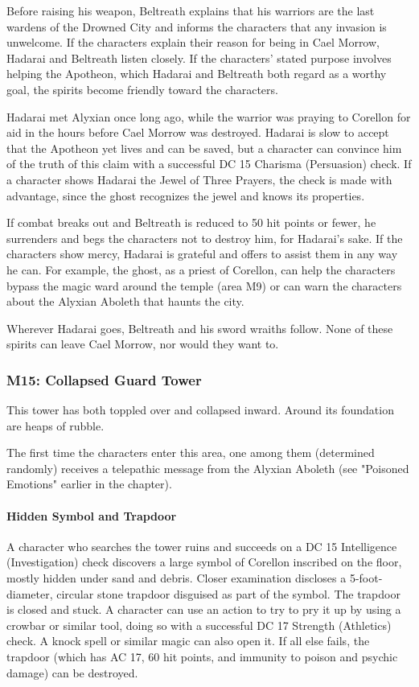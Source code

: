 \documentclass[10pt,a4paper,twoside,twocolumn,openany,nodeprecatedcode]{dndbook}
\begin{document}
Before raising his weapon, Beltreath explains that his warriors are the last wardens of the Drowned City and informs the characters that any invasion is unwelcome. If the characters explain their reason for being in Cael Morrow, Hadarai and Beltreath listen closely. If the characters' stated purpose involves helping the Apotheon, which Hadarai and Beltreath both regard as a worthy goal, the spirits become friendly toward the characters.

Hadarai met Alyxian once long ago, while the warrior was praying to Corellon for aid in the hours before Cael Morrow was destroyed. Hadarai is slow to accept that the Apotheon yet lives and can be saved, but a character can convince him of the truth of this claim with a successful DC 15 Charisma (Persuasion) check. If a character shows Hadarai the Jewel of Three Prayers, the check is made with advantage, since the ghost recognizes the jewel and knows its properties.

If combat breaks out and Beltreath is reduced to 50 hit points or fewer, he surrenders and begs the characters not to destroy him, for Hadarai's sake. If the characters show mercy, Hadarai is grateful and offers to assist them in any way he can. For example, the ghost, as a priest of Corellon, can help the characters bypass the magic ward around the temple (area M9) or can warn the characters about the Alyxian Aboleth that haunts the city.

Wherever Hadarai goes, Beltreath and his sword wraiths follow. None of these spirits can leave Cael Morrow, nor would they want to.

\subsubsection{M15: Collapsed Guard Tower}
\begin{DndReadAloud}{}
This tower has both toppled over and collapsed inward. Around its foundation are heaps of rubble.

\end{DndReadAloud}

The first time the characters enter this area, one among them (determined randomly) receives a telepathic message from the Alyxian Aboleth (see "Poisoned Emotions" earlier in the chapter).

\paragraph{Hidden Symbol and Trapdoor}
A character who searches the tower ruins and succeeds on a DC 15 Intelligence (Investigation) check discovers a large symbol of Corellon inscribed on the floor, mostly hidden under sand and debris. Closer examination discloses a 5-foot-diameter, circular stone trapdoor disguised as part of the symbol. The trapdoor is closed and stuck. A character can use an action to try to pry it up by using a crowbar or similar tool, doing so with a successful DC 17 Strength (Athletics) check. A knock spell or similar magic can also open it. If all else fails, the trapdoor (which has AC 17, 60 hit points, and immunity to poison and psychic damage) can be destroyed.
\end{document}
